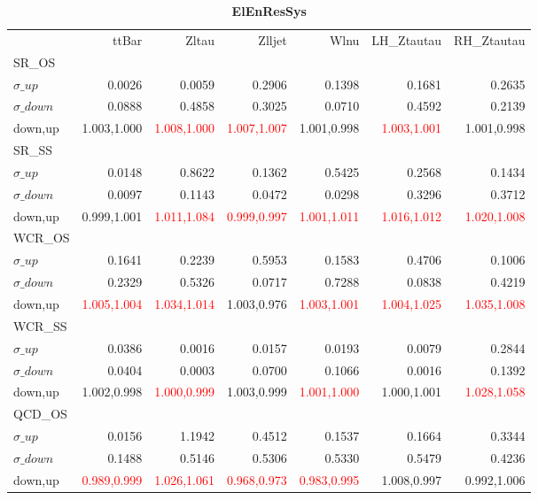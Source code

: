 \documentclass[11pt,oneside,a4paper]{article}
\begin{document}
\begin{table}
\centering
\caption{\bf{ElEnResSys}}
\begin{tabular}{lrrrrrr}
 & ttBar & Zltau & Zlljet & Wlnu & LH\_Ztautau & RH\_Ztautau \\
SR\_OS &  &  &  &  &  &  \\
$\sigma\_up$ & 0.0026 & 0.0059 & 0.2906 & 0.1398 & 0.1681 & 0.2635 \\
$\sigma\_down$ & 0.0888 & 0.4858 & 0.3025 & 0.0710 & 0.4592 & 0.2139 \\
down,up & 1.003,1.000 & \textcolor{red}{1.008,1.000} & \textcolor{red}{1.007,1.007} & 1.001,0.998 & \textcolor{red}{1.003,1.001} & 1.001,0.998 \\

\hline
SR\_SS &  &  &  &  &  &  \\
$\sigma\_up$ & 0.0148 & 0.8622 & 0.1362 & 0.5425 & 0.2568 & 0.1434 \\
$\sigma\_down$ & 0.0097 & 0.1143 & 0.0472 & 0.0298 & 0.3296 & 0.3712 \\
down,up & 0.999,1.001 & \textcolor{red}{1.011,1.084} & \textcolor{red}{0.999,0.997} & \textcolor{red}{1.001,1.011} & \textcolor{red}{1.016,1.012} & \textcolor{red}{1.020,1.008} \\

\hline
WCR\_OS &  &  &  &  &  &  \\
$\sigma\_up$ & 0.1641 & 0.2239 & 0.5953 & 0.1583 & 0.4706 & 0.1006 \\
$\sigma\_down$ & 0.2329 & 0.5326 & 0.0717 & 0.7288 & 0.0838 & 0.4219 \\
down,up & \textcolor{red}{1.005,1.004} & \textcolor{red}{1.034,1.014} & 1.003,0.976 & \textcolor{red}{1.003,1.001} & \textcolor{red}{1.004,1.025} & \textcolor{red}{1.035,1.008} \\

\hline
WCR\_SS &  &  &  &  &  &  \\
$\sigma\_up$ & 0.0386 & 0.0016 & 0.0157 & 0.0193 & 0.0079 & 0.2844 \\
$\sigma\_down$ & 0.0404 & 0.0003 & 0.0700 & 0.1066 & 0.0016 & 0.1392 \\
down,up & 1.002,0.998 & \textcolor{red}{1.000,0.999} & 1.003,0.999 & \textcolor{red}{1.001,1.000} & 1.000,1.001 & \textcolor{red}{1.028,1.058} \\

\hline
QCD\_OS &  &  &  &  &  &  \\
$\sigma\_up$ & 0.0156 & 1.1942 & 0.4512 & 0.1537 & 0.1664 & 0.3344 \\
$\sigma\_down$ & 0.1488 & 0.5146 & 0.5306 & 0.5330 & 0.5479 & 0.4236 \\
down,up & \textcolor{red}{0.989,0.999} & \textcolor{red}{1.026,1.061} & \textcolor{red}{0.968,0.973} & \textcolor{red}{0.983,0.995} & 1.008,0.997 & 0.992,1.006 \\


\end{tabular}
\end{table}
\end{document}
